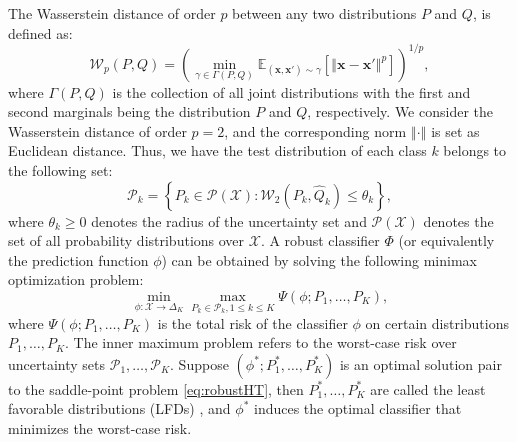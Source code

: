 \documentclass[journal]{IEEEtran}
\begin{document}
The Wasserstein distance \cite{villani2009optimal,peyre2019computational} of order $p$ between any two distributions $P$ and $Q$,
is defined as:
\begin{equation}
    \mathcal{W}_p\left(P, Q\right) = \left(\min_{\gamma\in\Gamma(P,Q)}\mathbb E_{(\boldsymbol{x},\boldsymbol{x}')\sim \gamma}\left[\left\Vert \boldsymbol{x} - \boldsymbol{x}' \right\Vert^p\right]\right)^{1/p},
\end{equation}
where $\Gamma(P,Q)$ is the collection of all joint distributions with the first and second marginals being the distribution $P$ and $Q$, respectively.
We consider the Wasserstein distance of order $p=2$, and the corresponding norm $\left\Vert \cdot \right\Vert$ is set as Euclidean distance.
Thus, we have the test distribution of each class $k$ belongs to the following set:
\begin{equation}
\label{eq:uncertainty_set}
\mathcal{P}_{k}=\left\{P_k\in \mathscr{P}({\mathcal{X}}): \mathcal{W}_2\left(P_k, \widehat{Q}_k\right) \leq \theta_k\right\},
\end{equation}
where $\theta_k\geq 0$ denotes the radius of the uncertainty set and $\mathscr{P}({\mathcal{X}})$ denotes the set of all probability distributions over $\mathcal X$.
A robust classifier $\Phi$ (or equivalently the prediction function $\phi$) can be obtained by solving the following minimax optimization problem:
\begin{equation}
\min _{\phi:\mathcal{X}\rightarrow \Delta_K} \max _{P_{k} \in \mathcal{P}_{k}, 1\leq k \leq K }\Psi\left(\phi; P_1,\ldots,P_{K}\right),
\label{eq:robustHT}
\end{equation}
where $\Psi\left(\phi; P_{1},\ldots, P_{K}\right)$ is the total risk of the classifier $\phi$ on certain distributions $P_1,\ldots,P_{K}$. 
The inner maximum problem refers to the worst-case risk over uncertainty sets $\mathcal{P}_1,\ldots,\mathcal{P}_{K}$.
%
Suppose $(\phi^*;P_1^*,\ldots,P_{K}^*)$ is an optimal solution pair to the saddle-point problem \eqref{eq:robustHT}, then $P_1^*,\ldots,P_{K}^*$ are called the least favorable distributions (LFDs) \cite{huber1965robust}, 
and $\phi^*$ induces the optimal classifier that minimizes the worst-case risk.
\end{document}
